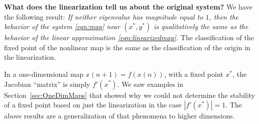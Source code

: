 \noindent
\textbf{What does the linearization tell us about the original system?}
We have the following result:
\emph{If neither eigenvalue has magnitude equal to $1$,
then the behavior of the system \eqref{eqn:map}
near $(x^*,y^*)$ is qualitatively the same as the behavior of the
linear approximation \eqref{eqn:linearizedmap}.}
The classification of the fixed point of the nonlinear map
is the same as the classification of the origin in the linearization.

In a one-dimensional map $x(n+1) = f(x(n))$, with a fixed
point $x^*$, the 
Jacobian ``matrix'' is simply $f'(x^*)$.  We saw examples
in Section~\ref{sec:OneDimMaps} that showed why we could not determine
the stability of a fixed point based on just the linearization
in the case $|f'(x^*)|=1$.  The above results are a generalization
of that phenomena to higher dimensions.


